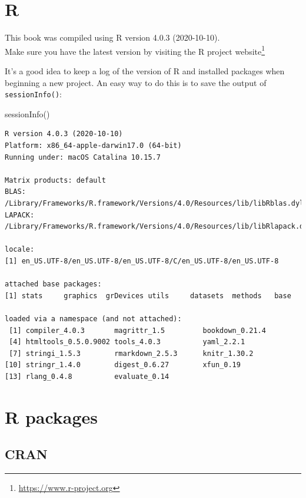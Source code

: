 \documentclass[
]{book}
\newenvironment{Shaded}{\begin{snugshade}}{\end{snugshade}}
\newcommand{\FunctionTok}[1]{\textcolor[rgb]{0.00,0.00,0.00}{#1}}
\newcommand{\NormalTok}[1]{#1}
\DeclareRobustCommand{\href}[2]{#2\footnote{\url{#1}}}
\begin{document}
\hypertarget{r}{%
\section{R}\label{r}}

This book was compiled using R version 4.0.3 (2020-10-10).\\
Make sure you have the latest version by visiting the \href{https://www.r-project.org}{R project website}

It's a good idea to keep a log of the version of R and installed packages when beginning a new project. An easy way to do this is to save the output of \texttt{sessionInfo()}:

\begin{Shaded}
\begin{Highlighting}[]
\FunctionTok{sessionInfo}\NormalTok{()}
\end{Highlighting}
\end{Shaded}

\begin{verbatim}
R version 4.0.3 (2020-10-10)
Platform: x86_64-apple-darwin17.0 (64-bit)
Running under: macOS Catalina 10.15.7

Matrix products: default
BLAS:   /Library/Frameworks/R.framework/Versions/4.0/Resources/lib/libRblas.dylib
LAPACK: /Library/Frameworks/R.framework/Versions/4.0/Resources/lib/libRlapack.dylib

locale:
[1] en_US.UTF-8/en_US.UTF-8/en_US.UTF-8/C/en_US.UTF-8/en_US.UTF-8

attached base packages:
[1] stats     graphics  grDevices utils     datasets  methods   base     

loaded via a namespace (and not attached):
 [1] compiler_4.0.3       magrittr_1.5         bookdown_0.21.4     
 [4] htmltools_0.5.0.9002 tools_4.0.3          yaml_2.2.1          
 [7] stringi_1.5.3        rmarkdown_2.5.3      knitr_1.30.2        
[10] stringr_1.4.0        digest_0.6.27        xfun_0.19           
[13] rlang_0.4.8          evaluate_0.14       
\end{verbatim}

\hypertarget{r-packages}{%
\section{R packages}\label{r-packages}}

\hypertarget{cran}{%
\subsection{CRAN}\label{cran}}
\end{document}
